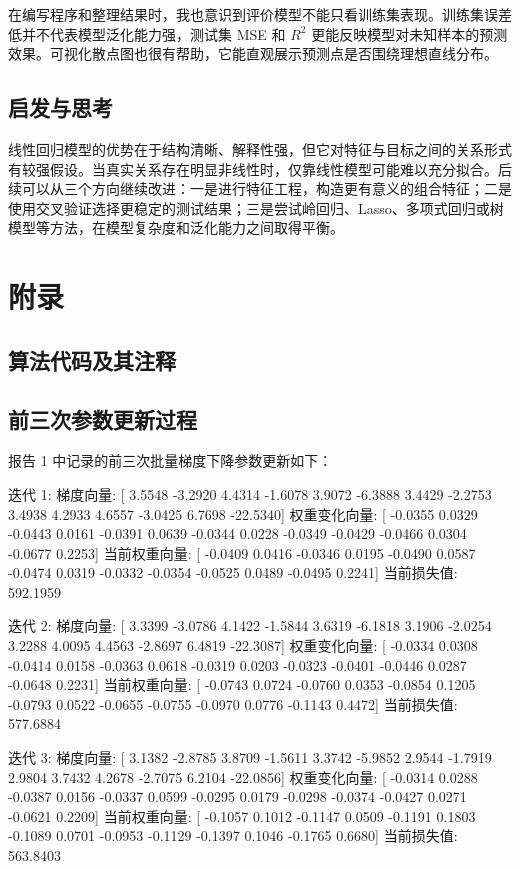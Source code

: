 \documentclass[UTF8,a4paper,12pt]{ctexart}
\begin{document}
在编写程序和整理结果时，我也意识到评价模型不能只看训练集表现。训练集误差低并不代表模型泛化能力强，测试集 MSE 和 $R^2$ 更能反映模型对未知样本的预测效果。可视化散点图也很有帮助，它能直观展示预测点是否围绕理想直线分布。

\subsection{启发与思考}

线性回归模型的优势在于结构清晰、解释性强，但它对特征与目标之间的关系形式有较强假设。当真实关系存在明显非线性时，仅靠线性模型可能难以充分拟合。后续可以从三个方向继续改进：一是进行特征工程，构造更有意义的组合特征；二是使用交叉验证选择更稳定的测试结果；三是尝试岭回归、Lasso、多项式回归或树模型等方法，在模型复杂度和泛化能力之间取得平衡。

\section{附录}

\subsection*{算法代码及其注释}


\subsection*{前三次参数更新过程}

报告 1 中记录的前三次批量梯度下降参数更新如下：

\begin{CodeBlock}
迭代 1:
梯度向量:
[  3.5548 -3.2920  4.4314 -1.6078  3.9072 -6.3888  3.4429 -2.2753  3.4938  4.2933  4.6557 -3.0425  6.7698 -22.5340]
权重变化向量:
[ -0.0355  0.0329 -0.0443  0.0161 -0.0391  0.0639 -0.0344  0.0228 -0.0349 -0.0429 -0.0466  0.0304 -0.0677  0.2253]
当前权重向量:
[ -0.0409  0.0416 -0.0346  0.0195 -0.0490  0.0587 -0.0474  0.0319 -0.0332 -0.0354 -0.0525  0.0489 -0.0495  0.2241]
当前损失值: 592.1959

迭代 2:
梯度向量:
[  3.3399 -3.0786  4.1422 -1.5844  3.6319 -6.1818  3.1906 -2.0254  3.2288  4.0095  4.4563 -2.8697  6.4819 -22.3087]
权重变化向量:
[ -0.0334  0.0308 -0.0414  0.0158 -0.0363  0.0618 -0.0319  0.0203 -0.0323 -0.0401 -0.0446  0.0287 -0.0648  0.2231]
当前权重向量:
[ -0.0743  0.0724 -0.0760  0.0353 -0.0854  0.1205 -0.0793  0.0522 -0.0655 -0.0755 -0.0970  0.0776 -0.1143  0.4472]
当前损失值: 577.6884

迭代 3:
梯度向量:
[  3.1382 -2.8785  3.8709 -1.5611  3.3742 -5.9852  2.9544 -1.7919  2.9804  3.7432  4.2678 -2.7075  6.2104 -22.0856]
权重变化向量:
[ -0.0314  0.0288 -0.0387  0.0156 -0.0337  0.0599 -0.0295  0.0179 -0.0298 -0.0374 -0.0427  0.0271 -0.0621  0.2209]
当前权重向量:
[ -0.1057  0.1012 -0.1147  0.0509 -0.1191  0.1803 -0.1089  0.0701 -0.0953 -0.1129 -0.1397  0.1046 -0.1765  0.6680]
当前损失值: 563.8403
\end{CodeBlock}
\end{document}
